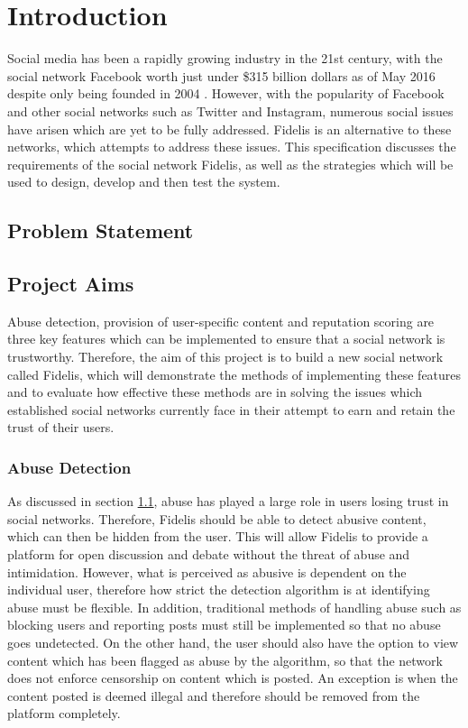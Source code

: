 \chapter{Introduction}
\label{Chapter:Introduction}

Social media has been a rapidly growing industry in the 21st century, with the social network Facebook worth just under \$315 billion dollars as of May 2016 despite only being founded in 2004 \cite{Forbes:Facebook}. However, with the popularity of Facebook and other social networks such as Twitter and Instagram, numerous social issues have arisen which are yet to be fully addressed. Fidelis is an alternative to these networks, which attempts to address these issues. This specification discusses the requirements of the social network Fidelis, as well as the strategies which will be used to design, develop and then test the system.

\section{Problem Statement}
\label{sec:problemstatement}

\section{Project Aims}
Abuse detection, provision of user-specific content and reputation scoring are three key features which can be implemented to ensure that a social network is trustworthy. Therefore, the aim of this project is to build a new social network called Fidelis, which will demonstrate the methods of implementing these features and to evaluate how effective these methods are in solving the issues which established social networks currently face in their attempt to earn and retain the trust of their users.

\subsection{Abuse Detection}
As discussed in section \ref{sec:problemstatement}, abuse has played a large role in users losing trust in social networks. Therefore, Fidelis should be able to detect abusive content, which can then be hidden from the user. This will allow Fidelis to provide a platform for open discussion and debate without the threat of abuse and intimidation. However, what is perceived as abusive is dependent on the individual user, therefore how strict the detection algorithm is at identifying abuse must be flexible. In addition, traditional methods of handling abuse such as blocking users and reporting posts must still be implemented so that no abuse goes undetected. On the other hand, the user should also have the option to view content which has been flagged as abuse by the algorithm, so that the network does not enforce censorship on content which is posted. An exception is when the content posted is deemed illegal and therefore should be removed from the platform completely.

